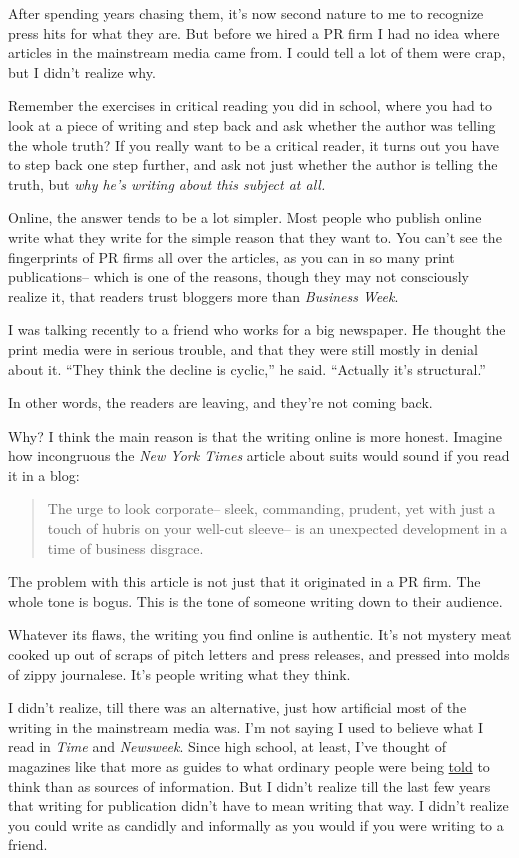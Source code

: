 \documentclass[12pt]{book}
\begin{document}
After spending years chasing them, it's now second nature to me to
recognize press hits for what they are. But before we hired a PR firm I
had no idea where articles in the mainstream media came from. I could
tell a lot of them were crap, but I didn't realize why.

Remember the exercises in critical reading you did in school, where you
had to look at a piece of writing and step back and ask whether the
author was telling the whole truth? If you really want to be a critical
reader, it turns out you have to step back one step further, and ask not
just whether the author is telling the truth, but \emph{why he's writing
about this subject at all.}

Online, the answer tends to be a lot simpler. Most people who publish
online write what they write for the simple reason that they want to.
You can't see the fingerprints of PR firms all over the articles, as you
can in so many print publications-- which is one of the reasons, though
they may not consciously realize it, that readers trust bloggers more
than \emph{Business Week}.

I was talking recently to a friend who works for a big newspaper. He
thought the print media were in serious trouble, and that they were
still mostly in denial about it. ``They think the decline is cyclic,''
he said. ``Actually it's structural.''

In other words, the readers are leaving, and they're not coming back.

Why? I think the main reason is that the writing online is more honest.
Imagine how incongruous the \emph{New York Times} article about suits
would sound if you read it in a blog:

\begin{quote}
The urge to look corporate-- sleek, commanding, prudent, yet with just a
touch of hubris on your well-cut sleeve-- is an unexpected development
in a time of business disgrace.
\end{quote}

The problem with this article is not just that it originated in a PR
firm. The whole tone is bogus. This is the tone of someone writing down
to their audience.

Whatever its flaws, the writing you find online is authentic. It's not
mystery meat cooked up out of scraps of pitch letters and press
releases, and pressed into molds of zippy journalese. It's people
writing what they think.

I didn't realize, till there was an alternative, just how artificial
most of the writing in the mainstream media was. I'm not saying I used
to believe what I read in \emph{Time} and \emph{Newsweek}. Since high
school, at least, I've thought of magazines like that more as guides to
what ordinary people were being \href{say.html}{told} to think than as
sources of information. But I didn't realize till the last few years
that writing for publication didn't have to mean writing that way. I
didn't realize you could write as candidly and informally as you would
if you were writing to a friend.
\end{document}
